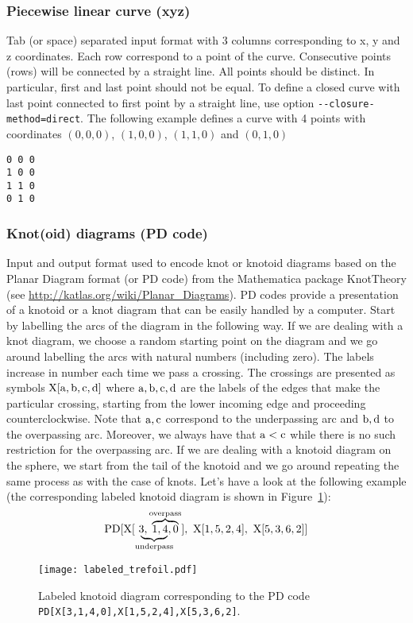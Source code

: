 \subsubsection{\label{sec:format:xyz}Piecewise linear curve (xyz)}
Tab (or space) separated input format with 3 columns corresponding to x, y and z coordinates. Each row correspond to a point of the curve. Consecutive points (rows) will be connected by a straight line. All points should be distinct. In particular, first and last point should not be equal. To define a closed curve with last point connected to first point by a straight line, use option \lstinline{--closure-method=direct}.
The following example defines a curve with 4 points with coordinates $(0,0,0)$, $(1,0,0)$, $(1,1,0)$ and $(0,1,0)$ 
\begin{lstlisting}
0 0 0
1 0 0
1 1 0
0 1 0
\end{lstlisting}
  
\subsubsection{\label{sec:format:pd}Knot(oid) diagrams (PD code)}
Input and output format used to encode knot or knotoid diagrams based on the Planar Diagram format (or PD code) from the Mathematica package KnotTheory\cite{knotatlas} (see \url{http://katlas.org/wiki/Planar_Diagrams}).
PD codes provide a presentation of a knotoid or a knot diagram that can be easily handled by a computer. Start by labelling the arcs of the diagram in the following way.
If we are dealing with a knot diagram, we choose a random starting point on the diagram and we go around labelling the arcs with natural numbers (including zero). The labels increase in number each time we pass a crossing. The crossings are presented as symbols ${\rm X[a,b,c,d]}$ where ${\rm a,b,c,d}$ are the labels of the edges that make the particular crossing, starting from the lower incoming edge and proceeding counterclockwise. Note that ${\rm a, c}$ correspond to the underpassing arc and ${\rm b,d}$ to the overpassing arc. Moreover, we always have that ${\rm a < c}$ while there is no such restriction for the overpassing arc. 
If we are dealing with a knotoid diagram on the sphere, we start from the tail of the knotoid and  we go around repeating the same process as with the case of knots.
 Let's have a look at the following example (the corresponding labeled knotoid diagram is shown in Figure~\ref{fig:labtref}):
\[
{\rm
PD[ X[ \lefteqn{\underbrace{\phantom{3,1,4}}_{{\rm underpass}}}\ 3,
\overbrace{1,4,0}^{overpass}], \ X[1,5,2,4],\ X[5,3,6,2]]
}
\]
\begin{figure}[t]
\centering
\texttt{[image: labeled\_trefoil.pdf]}
\caption{Labeled knotoid diagram corresponding to the PD code \lstinline{PD[X[3,1,4,0],X[1,5,2,4],X[5,3,6,2]}.}\label{fig:labtref}
\end{figure}

